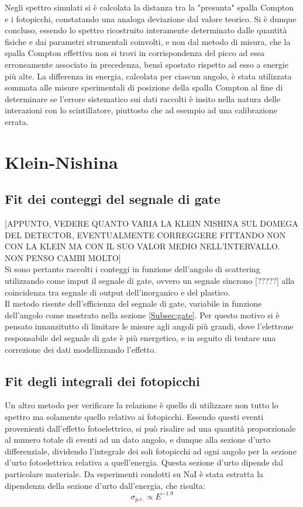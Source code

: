 \documentclass[8pt]{extarticle}
\begin{document}
Negli spettro simulati si è calcolata la distanza tra la "presunta" spalla Compton e i fotopicchi, constatando una analoga deviazione dal valore teorico. Si è dunque concluso, essendo lo spettro ricostruito interamente determinato dalle quantità fisiche e dai parametri strumentali coinvolti, e non dal metodo di misura, che la spalla Compton effettiva non si trovi in corrispondenza del picco ad essa erroneamente associato in precedenza, bensì spostato rispetto ad esso a energie più alte. La differenza in energia, calcolata per ciascun angolo, è stata utilizzata sommata alle misure sperimentali di posizione della spalla Compton al fine di determinare se l'errore sistematico sui dati raccolti è insito nella natura delle interazioni con lo scintillatore, piuttosto che ad esempio ad una calibrazione errata.

\section{Klein-Nishina}

\subsection{Fit dei conteggi del segnale di gate}
[APPUNTO, VEDERE QUANTO VARIA LA KLEIN NISHINA SUL DOMEGA DEL DETECTOR, EVENTUALMENTE CORREGGERE FITTANDO NON CON LA KLEIN MA CON IL SUO VALOR MEDIO NELL'INTERVALLO. NON PENSO CAMBI MOLTO]\\
Si sono pertanto raccolti i conteggi in funzione dell'angolo di scattering utilizzando come imput il segnale di gate, ovvero un segnale sincrono [?????] alla coincidenza tra segnale di output dell'inorganico e del plastico. \\
Il metodo risente dell'efficienza del segnale di gate, variabile in funzione dell'angolo come mostrato nella sezione \ref{Subsec:gate}. Per questo motivo si è pensato innanzitutto di limitare le misure agli angoli più grandi, dove l'elettrone responsabile del segnale di gate è più energetico, e in seguito di tentare una correzione dei dati modellizzando l'effetto.
\subsection{Fit degli integrali dei fotopicchi} \label{subsec:fotopicchi}
Un altro metodo per verificare la relazione è quello di utilizzare non tutto lo spettro ma solamente quello relativo ai fotopicchi. Essendo questi eventi provenienti dall'effetto fotoelettrico, si può risalire ad una quantità proporzionale al numero totale di eventi ad un dato angolo, e dunque alla sezione d'urto differenziale, dividendo l'integrale dei soli fotopicchi ad ogni angolo per la sezione d'urto fotoelettrica relativa a quell'energia.
Questa sezione d'urto dipende dal particolare materiale. Da esperimenti condotti su NaI\cite{naicat} è stata estratta la dipendenza della sezione d'urto dall'energia, che risulta: \\
\begin{equation}
\sigma_{p.e.} \propto E^{-1.9}
\nonumber
\end{equation}
\end{document}
